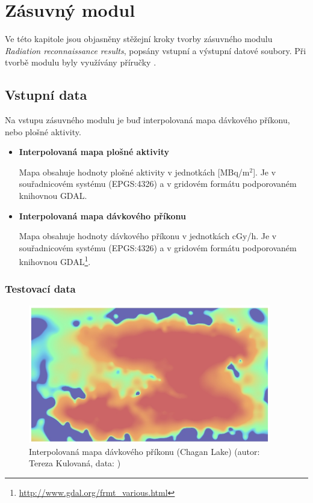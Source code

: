 \chapter{Zásuvný modul}
\label{4-plugin}

Ve této kapitole jsou objasněny stěžejní kroky tvorby zásuvného modulu
\textit{Radiation reconnaissance results}, popsány vstupní a výstupní
datové soubory. Při tvorbě modulu byly využívány příručky \cite{diveintopython} 
\cite{cookbook} \cite{qgis} \cite{ucebnicepython}.

\section{Vstupní data}

Na vstupu zásuvného modulu je buď interpolovaná mapa dávkového
příkonu, nebo plošné aktivity.

\begin{itemize}
\item \textbf{Interpolovaná mapa plošné aktivity}

  Mapa obsahuje hodnoty plošné aktivity v jednotkách
  {[}MBq/m$^2${]}. Je v souřadnicovém systému  (EPGS:4326)
  a v gridovém formátu podporovaném knihovnou GDAL.

\item \textbf{Interpolovaná mapa dávkového příkonu}

  Mapa obsahuje hodnoty dávkového příkonu v jednotkách cGy/h. Je v
  souřadnicovém systému  (EPGS:4326) a v gridovém formátu
  podporovaném knihovnou
  GDAL\footnote{\url{http://www.gdal.org/frmt_various.html}}.
	
\end{itemize}

\subsection{Testovací data}

\begin{figure}[H]
    \centering
      \includegraphics[width=300pt]{./pictures/chagan_spline.jpg}
      \caption[Interpolovaná mapa]{Interpolovaná mapa dávkového příkonu (Chagan Lake) (autor: Tereza Kulovaná, data: )}
      \label{fig:spline}
\end{figure}


